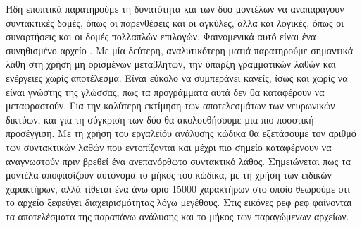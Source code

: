 Ήδη εποπτικά παρατηρούμε τη δυνατότητα και των δύο μοντέλων να αναπαράγουν συντακτικές δομές, όπως οι παρενθέσεις και οι αγκύλες, αλλα και λογικές, όπως οι συναρτήσεις και οι δομές πολλαπλών επιλογών.
Φαινομενικά αυτό είναι ένα συνηθισμένο αρχείο .
Με μία δεύτερη, αναλυτικότερη ματιά παρατηρούμε σημαντικά λάθη στη χρήση μη ορισμένων μεταβλητών, την ύπαρξη γραμματικών λαθών και ενέργειες χωρίς αποτέλεσμα. 
Είναι εύκολο να συμπεράνει κανείς, ίσως και χωρίς να είναι γνώστης της γλώσσας, πως τα προγράμματα αυτά δεν θα καταφέρουν να μεταφραστούν. 
Για την καλύτερη εκτίμηση των αποτελεσμάτων των νευρωνικών δικτύων, και για τη σύγκριση των δύο  θα ακολουθήσουμε μια πιο ποσοτική προσέγγιση. 
Με τη χρήση του εργαλείόυ ανάλυσης κώδικα  θα εξετάσουμε τον αριθμό των συντακτικών λαθών που εντοπίζονται και μέχρι πιο σημείο καταφέρνουν να αναγνωστούν πριν βρεθεί ένα ανεπανόρθωτο συντακτικό λάθος.
Σημειώνεται πως τα μοντέλα αποφασίζουν αυτόνομα το μήκος του κώδικα, με τη χρήση των ειδικών χαρακτήρων, αλλά τίθεται ένα άνω όριο 15000 χαρακτήρων στο οποίο θεωρούμε οτι το αρχείο ξεφεύγει διαχειρισμότητας λόγω μεγέθους.
Στις εικόνες ρεφ ρεφ φαίνονται τα αποτελέσματα της παραπάνω ανάλυσης και το μήκος των παραγώμενων αρχείων.


